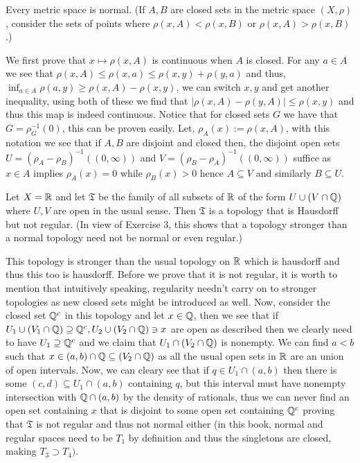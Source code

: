 \documentclass[12pt,a4paper]{article}
\begin{document}
\begin{problem}\label{prob:4-3}
Every metric space is normal. (If $A, B$ are closed sets in the metric space $(X,\rho)$, consider the sets of points where $\rho(x,A) < \rho(x,B)$ or $\rho(x,A) > \rho(x,B)$.)
\end{problem}
\begin{solution}
We first prove that $x\mapsto\rho(x,A)$ is continuous when $A$ is closed. 
For any $a\in A$ we see that $\rho(x,A)\leq\rho(x,a)\leq\rho(x,y)+\rho(y,a)$ and thus, $\inf_{a\in A}\rho(a,y)\geq\rho(x,A)-\rho(x,y)$, we can switch $x,y$ and get another inequality, using both of these we find that $|\rho(x,A)-\rho(y,A)|\leq\rho(x,y)$ and thus this map is indeed continuous. 
Notice that for closed sets $G$ we have that $G=\rho_G^{-1}( \qty{0})$, this can be proven easily.
Let, $\rho_A(x):=\rho(x,A)$, with this notation we see that if $A,B$ are disjoint and closed then, the disjoint open sets $U=(\rho_A-\rho_B)^{-1}((0,\infty))$ and $V=(\rho_B-\rho_A)^{-1}((0,\infty))$ suffice as $x\in A$ implies $\rho_A(x)=0$ while $\rho_B(x)>0$ hence $A\subseteq V$ and similarly $B\subseteq U.$ 
\end{solution}
\begin{problem}\label{prob:4-4}
Let $X = \mathbb{R}$ and let $\mathfrak{T}$ be the family of all subsets of $\mathbb{R}$ of the form $U \cup (V \cap \mathbb{Q})$ where $U, V$ are open in the usual sense. Then $\mathfrak{T}$ is a topology that is Hausdorff but not regular. (In view of Exercise 3, this shows that a topology stronger than a normal topology need not be normal or even regular.)
\end{problem}
\begin{solution}
This topology is stronger than the usual topology on $\mathbb{R}$ which is hausdorff and thus this too is hausdorff. 
Before we prove that it is not regular, it is worth to mention that intuitively speaking, regularity needn't carry on to stronger topologies as new closed sets might be introduced as well. 
Now, consider the closed set $\mathbb{Q}^c$ in this topology and let $x\in\mathbb{Q}$, then we see that if $U_1\cup(V_1\cap\mathbb{Q})\supseteq\mathbb{Q}^c,U_2\cup(V_2\cap\mathbb{Q})\ni x$ are open as described then we clearly need to have $U_1\supseteq\mathbb{Q}^c$ and we claim that $U_1\cap(V_2\cap\mathbb{Q})$ is nonempty. 
We can find $a<b$ such that $x\in(a,b)\cap\mathbb{Q}\subseteq(V_2\cap\mathbb{Q})$ as all the usual open sets in $\mathbb{R}$ are an union of open intervals. 
Now, we can cleary see that if $q\in U_1\cap(a,b)$ then there is some $(c,d)\subseteq U_1\cap(a,b)$ containing $q$, but this interval must have nonempty intersection with $\mathbb{Q}\cap(a,b)$ by the density of rationals, thus we can never find an open set containing $x$ that is disjoint to some open set containing $\mathbb{Q}^c$ proving that $\mathfrak T$ is not regular and thus not normal either (in this book, normal and regular spaces need to be $T_1$ by definition and thus the singletons are closed, making $T_3\supset T_4)$. 
\end{solution}
\end{document}
